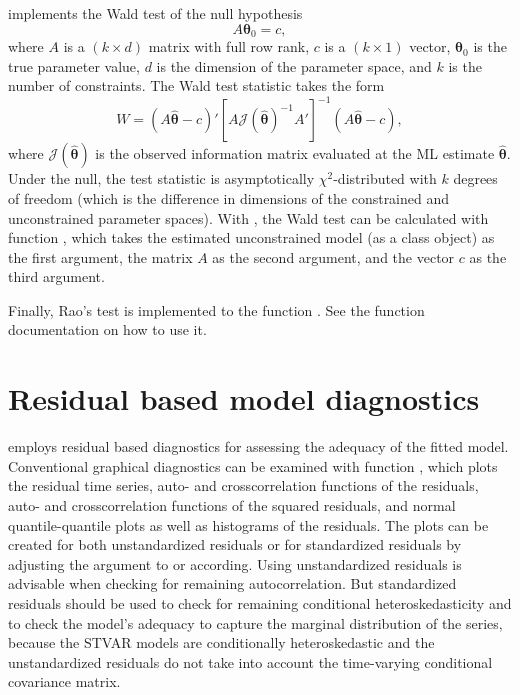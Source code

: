 \documentclass[nojss]{jss}
\begin{document}
 implements the Wald test of the null hypothesis
\begin{equation}
A\boldsymbol{\theta}_0 = c,
\end{equation}
where $A$ is a $(k \times d)$ matrix with full row rank, $c$ is a $(k \times 1)$ vector, $\boldsymbol{\theta}_0$ is the true parameter value, $d$ is the dimension of the parameter space, and $k$ is the number of constraints. The Wald test statistic takes the form
\begin{equation}
W = (A\hat{\boldsymbol{\theta}} - c)' [A\mathcal{J}(\hat{\boldsymbol{\theta}})^{-1}A']^{-1}(A\hat{\boldsymbol{\theta}} - c),
\end{equation}
where $\mathcal{J}(\hat{\boldsymbol{\theta}})$ is the observed information matrix evaluated at the ML estimate $\hat{\boldsymbol{\theta}}$. Under the null, the test statistic is asymptotically $\chi^2$-distributed with $k$ degrees of freedom (which is the difference in dimensions of the constrained and unconstrained parameter spaces). With , the Wald test can be calculated with function , which takes the estimated unconstrained model (as a class  object) as the first argument, the matrix $A$ as the second argument, and the vector $c$ as the third argument.

Finally, Rao's test is implemented to the function . See the function documentation on how to use it.

\section{Residual based model diagnostics}\label{sec:res}
 employs residual based diagnostics for assessing the adequacy of the fitted model. Conventional graphical diagnostics can be examined with function , which plots the residual time series, auto- and crosscorrelation functions of the residuals, auto- and crosscorrelation functions of the squared residuals, and normal quantile-quantile plots as well as histograms of the residuals. The plots can be created for both unstandardized residuals or for standardized residuals by adjusting the argument  to  or  according. Using unstandardized residuals is advisable when checking for remaining autocorrelation. But standardized residuals should be used to check for remaining conditional heteroskedasticity and to check the model's adequacy to capture the marginal distribution of the series, because the STVAR models are conditionally heteroskedastic and the unstandardized residuals do not take into account the time-varying conditional covariance matrix.
\end{document}
